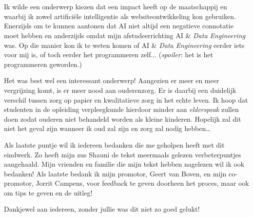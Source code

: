 
\chapter*{}
\label{ch:voorwoord}




Ik wilde een onderwerp kiezen dat een impact heeft op de maatschappij en waarbij ik zowel artificiële intelligentie als websiteontwikkeling kon gebruiken. Enerzijds om te kunnen aantonen dat AI niet altijd een negatieve connotatie moet hebben en anderzijds omdat mijn afstudeerrichting AI \& \textit{Data Engineering} was. Op die manier kon ik te weten komen of AI \& \textit{Data Engineering} eerder iets voor mij is, of toch eerder het programmeren zelf$\ldots$ (\textit{spoiler}: het is het programmeren geworden.)

Het was best wel een interessant onderwerp! Aangezien er meer en meer vergrijzing komt, is er meer nood aan ouderenzorg. Er is daarbij een duidelijk verschil tussen zorg op papier en kwalitatieve zorg in het echte leven. Ik hoop dat studenten in de opleiding verpleegkunde hierdoor minder aan \textit{elderspeak} zullen doen zodat ouderen niet behandeld worden als kleine kinderen. Hopelijk zal dit niet het geval zijn wanneer ik oud zal zijn en zorg zal nodig hebben\ldots

Als laatste puntje wil ik iedereen bedanken die me geholpen heeft met dit eindwerk. Zo heeft mijn zus Shauni de tekst meermaals gelezen verbeterpuntjes aangehaald. Mijn vrienden en familie die mijn tekst hebben nagelezen wil ik ook bedanken!
Als laatste bedank ik mijn promotor, Geert van Boven, en mijn co-promotor, Jorrit Campens, voor feedback te geven doorheen het proces, maar ook om tips te geven en de uitleg!

Dankjewel aan iedereen, zonder jullie was dit niet zo goed gelukt!